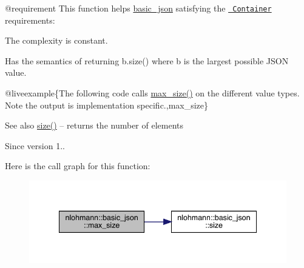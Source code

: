 @requirement This function helps {\ttfamily \mbox{\hyperlink{classnlohmann_1_1basic__json}{basic\+\_\+json}}} satisfying the \href{http://en.cppreference.com/w/cpp/concept/Container}{\texttt{ Container}} requirements\+:
\begin{DoxyItemize}
\item The complexity is constant.
\item Has the semantics of returning {\ttfamily b.\+size()} where {\ttfamily b} is the largest possible J\+S\+ON value.
\end{DoxyItemize}

@liveexample\{The following code calls {\ttfamily \mbox{\hyperlink{classnlohmann_1_1basic__json_a2f47d3c6a441c57dd2be00449fbb88e1}{max\+\_\+size()}}} on the different value types. Note the output is implementation specific.,max\+\_\+size\}

\begin{DoxySeeAlso}{See also}
\mbox{\hyperlink{classnlohmann_1_1basic__json_a25e27ad0c6d53c01871c5485e1f75b96}{size()}} -- returns the number of elements
\end{DoxySeeAlso}
\begin{DoxySince}{Since}
version 1.. 
\end{DoxySince}
Here is the call graph for this function\+:
\nopagebreak
\begin{figure}[H]
\begin{center}
\leavevmode
\includegraphics[width=341pt]{classnlohmann_1_1basic__json_a2f47d3c6a441c57dd2be00449fbb88e1_cgraph}
\end{center}
\end{figure}
\mbox{\label{classnlohmann_1_1basic__json_aef6d0eeccee7c5c7e1317c2ea1607fab}} 
